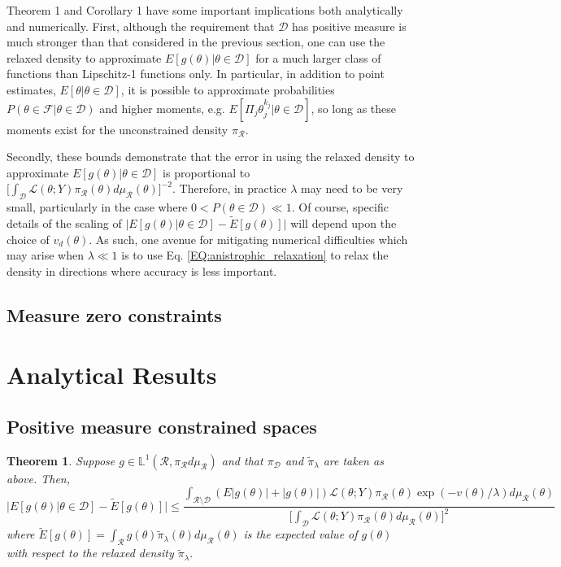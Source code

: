 \documentclass[10pt,fleqn]{article}
\newtheorem{theorem}{Theorem}
\DeclareMathOperator{\1}{\mathbbm{1}}
\begin{document}
{Theorem 1 and Corollary 1 have some important implications both analytically and numerically.  First, although the requirement that $\mathcal{D}$ has positive measure is much stronger than that considered in the previous section, one can use the relaxed density to approximate $E[g(\theta)|\theta\in\mathcal{D}]$ for a much larger class of functions than Lipschitz-1 functions only.  In particular, in addition to point estimates, $E[\theta|\theta\in\mathcal{D}]$, it is possible to approximate probabilities $P(\theta \in \mathcal{F}|\theta \in \mathcal{D})$ and higher moments, e.g. $E[\Pi_j \theta_j^{k_j} |\theta\in\mathcal{D}]$, so long as these moments exist for the unconstrained density $\pi_\mathcal{R}.$ 

Secondly, these bounds demonstrate that the error in using the relaxed density to approximate $E[g(\theta)|\theta\in\mathcal{D}]$ is proportional to $[\int_\mathcal{D}\mathcal{L}(\theta; Y)  \pi_\mathcal{R}(\theta)d\mu_\mathcal{R}(\theta)\big]^{-2}.$  Therefore, in practice $\lambda$ may need to be very small, particularly in the case where $0<P(\theta\in\mathcal{D})\ll 1.$ Of course, specific details of the scaling of $\bigg|E[g(\theta) |\theta\in\mathcal{D}] - \tilde{E}[g(\theta)]   \bigg|$ will depend upon the choice of $v_d(\theta)$. As such, one avenue for mitigating numerical difficulties which may arise when $\lambda \ll 1$ is to use Eq. \ref{EQ:anistrophic_relaxation} to relax the density in directions where accuracy is less important.

\subsection{Measure zero constraints}
\label{SEC:Zero_Measure_Methods}



\section{Analytical Results}
\subsection{Positive measure constrained spaces}
\label{SEC:Positive_measure_theory}

\begin{theorem}
\label{THM:positive_measure_approximation_error}
Suppose $g \in \mathbb{L}^1(\mathcal{R}, \pi_\mathcal{R}d\mu_\mathcal{R})$ and that $\pi_\mathcal{D}$ and $\tilde{\pi}_\lambda$ are taken as above.  Then,
$$\bigg|E[g(\theta) |\theta\in\mathcal{D}] - \tilde{E}[g(\theta)]   \bigg| \le \frac{\int_{\mathcal{R}\setminus \mathcal{D}} (E|g(\theta)|+|g(\theta)|) \mathcal{L}(\theta; Y) \pi_\mathcal{R}(\theta)\exp(-v(\theta)/\lambda ) d\mu_\mathcal{R}(\theta)}{\big[\int_\mathcal{D} \mathcal{L}(\theta; Y) \pi_\mathcal{R}(\theta)d\mu_\mathcal{R}(\theta)\big]^2 }$$
where $\tilde{E}[g(\theta)] = \int_\mathcal{R} g(\theta) \tilde{\pi}_\lambda(\theta)d\mu_\mathcal{R}(\theta)$ is the expected value of $g(\theta)$ with respect to the relaxed density $\tilde{\pi}_\lambda.$
\end{theorem}

}
\end{document}
